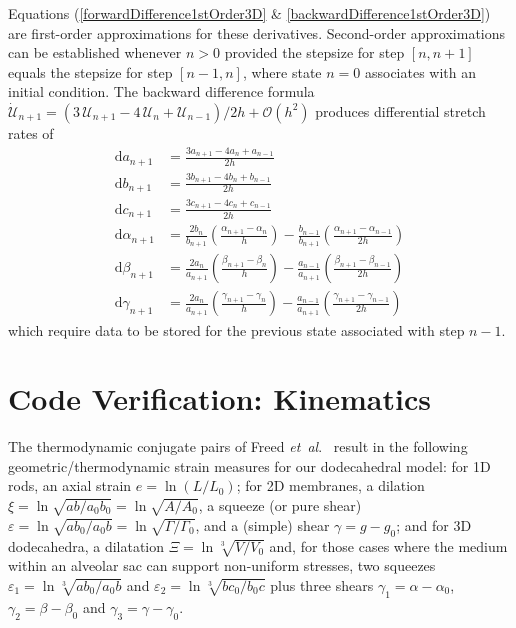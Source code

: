 Equations (\ref{forwardDifference1stOrder3D} \& \ref{backwardDifference1stOrder3D}) are first-order approximations for these derivatives.  Second-order approximations can be established whenever $n > 0$ provided the stepsize for step $[n, n+1]$ equals the stepsize for step $[n-1, n]$, where state $n=0$ associates with an initial condition.  The backward difference formula  $\dot{\boldsymbol{\mathcal{U}}}_{n+1} = ( 3 \, \boldsymbol{\mathcal{U}}_{n+1} -  4 \, \boldsymbol{\mathcal{U}}_{n} + \boldsymbol{\mathcal{U}}_{n-1} ) / 2h + \mathcal{O}(h^2)$ produces differential stretch rates of
\begin{equation}
\begin{aligned}
\mathrm{d} a_{n+1} & 
= \frac {3a_{n+1} - 4a_{n} +  a_{n-1}}{2h} \\ 
\mathrm{d} b_{n+1} & 
= \frac {3b_{n+1} - 4b_{n} +  b_{n-1}}{2h} \\
\mathrm{d} c_{n+1} & 
= \frac {3c_{n+1} - 4c_{n} +  c_{n-1}}{2h} \\
\mathrm{d} \alpha_{n+1} & 
= \frac{2b_{n}} {b_{n+1}} \left( \frac{\alpha_{n+1} - \alpha_{n}}{h} \right) - \frac{b_{n-1}} {b_{n+1}} \left( \frac{\alpha_{n+1} - \alpha_{n-1}}{2h} \right) \\
\mathrm{d} \beta_{n+1} & 
= \frac{2a_{n}}{a_{n+1}} \left( \frac{\beta_{n+1} - \beta_{n} }{h} \right) - \frac{a_{n-1}} {a_{n+1}} \left( \frac{\beta_{n+1} - \beta_{n-1}}{2h} \right) \\ 
\mathrm{d} \gamma_{n+1} & 
= \frac{2a_{n}} {a_{n+1}} \left(\frac{\gamma_{n+1} - \gamma_{n}}{h} \right) - \frac{a_{n-1}}{a_{n+1}} \left( \frac{\gamma_{n+1} - \gamma_{n-1}}{2h} \right) 
\end{aligned}
\label{backwardDifference2ndOrder3D}
\end{equation}
which require data to be stored for the previous state associated with step $n-1$.

\section{Code Verification: Kinematics}
\label{sec:verification}

The thermodynamic conjugate pairs of Freed \textit{et~al}.\ \cite{Freed17,Freedetal17,FreedZamani19} result in the following geometric/thermo\-dynamic strain measures for our dodecahedral model: for 1D rods, an axial strain $e = \ln ( L / L_0 )$; for 2D membranes, a dilation $\xi = \ln \sqrt{ab/a_0b_0} = \ln \sqrt{A/A_0}$, a squeeze (or pure shear) $\varepsilon = \ln \sqrt{ab_0/a_0b} = \ln \sqrt{\Gamma / \Gamma_0}$, and a (simple) shear $\gamma = g - g_0$; and for 3D dodecahedra, a dilatation $\Xi = \ln \sqrt[3]{V \! / V_0}$ and, for those cases where the medium within an alveolar sac can support non-uniform stresses, two squeezes $\varepsilon_1 = \ln \sqrt[3]{a b_0 / a_0 b}$ and $\varepsilon_2 = \ln \sqrt[3]{b c_0 / b_0 c}$ plus three shears $\gamma_1 = \alpha - \alpha_0$, $\gamma_2 = \beta - \beta_0$ and $\gamma_3 = \gamma - \gamma_0$. 

